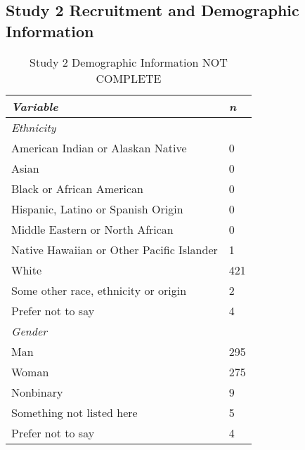 \documentclass[12pt,]{article}
\begin{document}

\clearpage
\subsection{Study 2 Recruitment and Demographic Information}
\label{appendix:recruit_2}


\begin{table}[ht]
    \centering
    \begin{tabular}{l l}
        \toprule
        \emph{Variable} & \emph{n} \\
        \midrule
        \emph{Ethnicity} &  \\
        \hspace{1em} American Indian or Alaskan Native & 0 \\
        \hspace{1em} Asian & 0 \\
        \hspace{1em} Black or African American & 0 \\
        \hspace{1em} Hispanic, Latino or Spanish Origin & 0 \\
        \hspace{1em} Middle Eastern or North African& 0\\
        \hspace{1em} Native Hawaiian or Other Pacific Islander & 1 \\ 
        \hspace{1em} White & 421 \\ 
        \hspace{1em} Some other race, ethnicity or origin & 2 \\ 
        \hspace{1em} Prefer not to say & 4 \\ 
      \emph{Gender} & \\ 
         \hspace{1em} Man & 295 \\
         \hspace{1em} Woman & 275 \\
         \hspace{1em} Nonbinary & 9 \\
         \hspace{1em} Something not listed here & 5 \\
         \hspace{1em} Prefer not to say & 4 \\
        \bottomrule
    \end{tabular}
     \caption{Study 2 Demographic Information NOT COMPLETE}
     \label{demo2}
\end{table}
\end{document}

